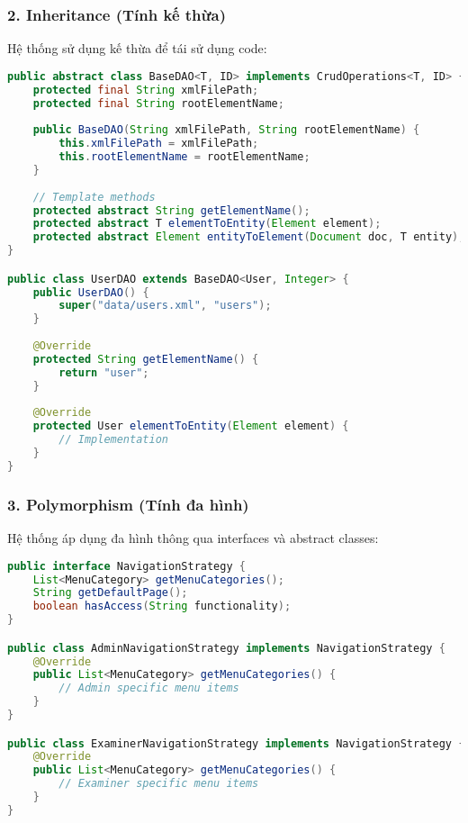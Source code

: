\documentclass[12pt,a4paper]{article}
\begin{document}
\subsubsection{2. Inheritance (Tính kế thừa)}

Hệ thống sử dụng kế thừa để tái sử dụng code:

\begin{lstlisting}[language=Java, caption=Ví dụ về Inheritance với BaseDAO]
public abstract class BaseDAO<T, ID> implements CrudOperations<T, ID> {
    protected final String xmlFilePath;
    protected final String rootElementName;
    
    public BaseDAO(String xmlFilePath, String rootElementName) {
        this.xmlFilePath = xmlFilePath;
        this.rootElementName = rootElementName;
    }
    
    // Template methods
    protected abstract String getElementName();
    protected abstract T elementToEntity(Element element);
    protected abstract Element entityToElement(Document doc, T entity);
}

public class UserDAO extends BaseDAO<User, Integer> {
    public UserDAO() {
        super("data/users.xml", "users");
    }
    
    @Override
    protected String getElementName() {
        return "user";
    }
    
    @Override
    protected User elementToEntity(Element element) {
        // Implementation
    }
}
\end{lstlisting}

\subsubsection{3. Polymorphism (Tính đa hình)}

Hệ thống áp dụng đa hình thông qua interfaces và abstract classes:

\begin{lstlisting}[language=Java, caption=Ví dụ về Polymorphism với NavigationStrategy]
public interface NavigationStrategy {
    List<MenuCategory> getMenuCategories();
    String getDefaultPage();
    boolean hasAccess(String functionality);
}

public class AdminNavigationStrategy implements NavigationStrategy {
    @Override
    public List<MenuCategory> getMenuCategories() {
        // Admin specific menu items
    }
}

public class ExaminerNavigationStrategy implements NavigationStrategy {
    @Override
    public List<MenuCategory> getMenuCategories() {
        // Examiner specific menu items
    }
}
\end{lstlisting}
\end{document}
